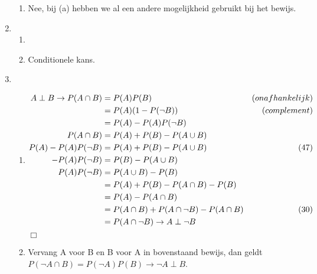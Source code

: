 \documentclass{article}
\begin{document}
\begin{enumerate}
\begin{enumerate}
            \item
                Nee, bij (a) hebben we al een andere mogelijkheid gebruikt bij
                het bewijs.

        \end{enumerate}

    \item
        \begin{enumerate}
            \item
            \item
                Conditionele kans.

        \end{enumerate}

    \item
        \begin{enumerate}
            \item
                \begin{align}
                    A \perp B \to P(A \cap B) &= P(A) P(B) & (onafhankelijk) \notag \\
                                              &= P(A) (1 - P(\lnot B)) & (complement)
                    \notag \\
                                              &= P(A) -P(A)P(\lnot B) \\
                    P(A \cap B) &= P(A) + P(B) - P(A \cup B) \notag \\
                    P(A) - P(A) P(\lnot B) &= P(A) + P(B) - P(A \cup B) & (47) \\
                    -P(A) P(\lnot B) &= P(B) - P(A \cup B) \notag \\
                    P(A) P(\lnot B) &= P(A \cup B) - P(B) \notag \\
                                    &= P(A) + P(B) - P(A \cap B) - P(B) \notag \\
                                    &= P(A) - P(A \cap B) \notag \\
                                    &= P(A \cap B) + P(A \cap \lnot B) - P(A \cap B)
                    & (30) \notag \\
                    &= P(A \cap \lnot B) \to A \perp \lnot B
                \end{align}
                $\Box$

            \item
                Vervang A voor B en B voor A in bovenstaand bewijs, dan geldt
                $P(\lnot A \cap B) = P(\lnot A) P(B) \to \lnot A \perp B$.


\end{enumerate}
\end{enumerate}
\end{document}
